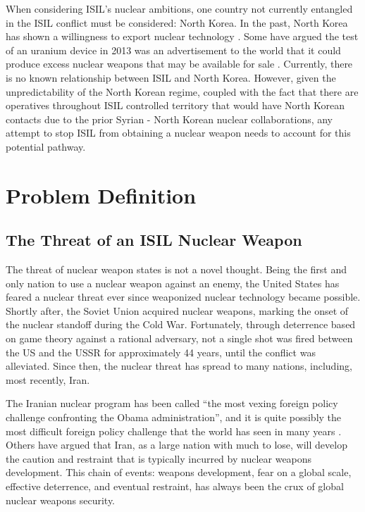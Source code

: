 \documentclass{report}
\begin{document}
When considering ISIL’s nuclear ambitions, one country not currently entangled in the ISIL conflict must be considered: North Korea.  In the past, North Korea has shown a willingness to export nuclear technology \cite{Wit2013}.  Some have argued the test of an uranium device in 2013 was an advertisement to the world that it could produce excess nuclear weapons that may be available for sale \cite{Allison2013}.  Currently, there is no known relationship between ISIL and North Korea.  However, given the unpredictability of the North Korean regime, coupled with the fact that there are operatives throughout ISIL controlled territory that would have North Korean contacts due to the prior Syrian - North Korean nuclear collaborations, any attempt to stop ISIL from obtaining a nuclear weapon needs to account for this potential pathway.     






\chapter{Problem Definition}

\section{The Threat of an ISIL  Nuclear Weapon}

The threat of  nuclear weapon states is not a novel thought. Being the first and only nation to use a nuclear weapon against an enemy, the United States has feared a nuclear threat ever since weaponized nuclear technology became possible. Shortly after, the Soviet Union acquired nuclear weapons, marking the onset of the nuclear standoff during the Cold War.   Fortunately, through deterrence based on game theory against a rational adversary, not a single shot was fired between the US and the USSR for approximately 44 years, until the conflict was alleviated. Since then, the nuclear threat has spread to many nations, including, most recently, Iran. 

The Iranian nuclear program has been called \enquote{the most vexing foreign policy challenge confronting the Obama administration}, and it is quite possibly the most difficult foreign policy challenge that the world has seen in many years \cite{Edelman2011}. Others have argued that Iran, as a large nation with much to lose, will develop the caution and restraint that is typically incurred by nuclear weapons development. This chain of events: weapons development, fear on a global scale, effective deterrence, and eventual restraint, has always been the crux of global nuclear weapons security. 
\end{document}
